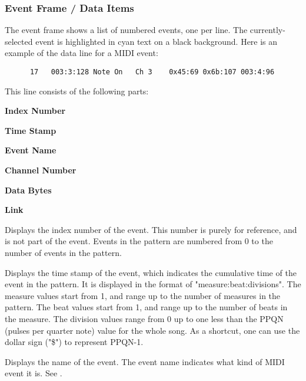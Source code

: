 \subsubsection{Event Frame / Data Items}
\label{subsec:event_frame_data}

   The event frame shows a list of numbered events, one per line.
   The currently-selected event is highlighted in cyan text on a black
   background.  Here is an example of the data line for a MIDI event:

   \begin{verbatim}
      17   003:3:128 Note On   Ch 3    0x45:69 0x6b:107 003:4:96
   \end{verbatim}

   This line consists of the following parts:

   \begin{enumber}
      \item \textbf{Index Number}
      \item \textbf{Time Stamp}
      \item \textbf{Event Name}
      \item \textbf{Channel Number}
      \item \textbf{Data Bytes}
      \item \textbf{Link}
   \end{enumber}

   \setcounter{ItemCounter}{0}      %

   Displays the index number of the event.
   This number is purely for reference, and is not part
   of the event.  Events in the pattern are numbered from 0 to the number of
   events in the pattern.

   Displays the time stamp of the event,
   which indicates the cumulative time of the event in the pattern.
   It is displayed in the format of "measure:beat:divisions".
   The measure values start from 1, and range up to the number of measures in
   the pattern.
   The beat values start from 1, and range up to the number of beats in the
   measure.
   The division values range from 0 up to one less than the
   PPQN (pulses per quarter note) value for the whole song.
   As a shortcut, one can use the dollar sign ("\$") to represent
   PPQN-1.

   Displays the name of the event.
   The event name indicates what kind of MIDI event it is. 
   See .

